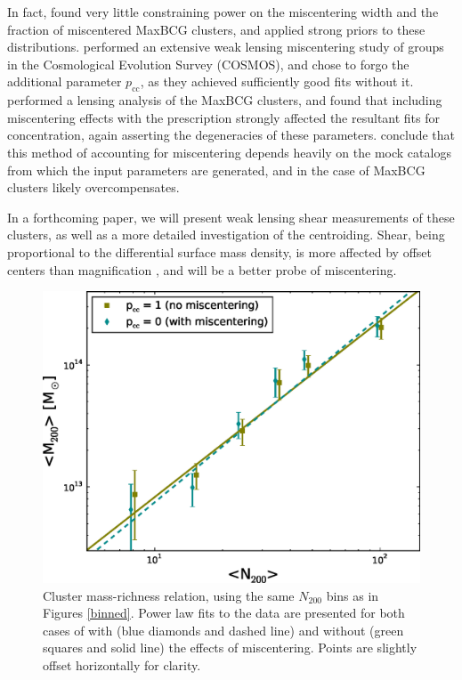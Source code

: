 In fact, \citet{Johnston07} found very little constraining power on the miscentering width and the fraction of miscentered MaxBCG clusters, and applied strong priors to these distributions. \citet{George12} performed an extensive weak lensing miscentering study of groups in the Cosmological Evolution Survey (COSMOS), and chose to forgo the additional parameter $p_{\mathrm{cc}}$, as they achieved sufficiently good fits without it. \citet{Mandelbaum08b} performed a lensing analysis of the MaxBCG clusters, and found that including miscentering effects with the \citet{Johnston07} prescription strongly affected the resultant fits for concentration, again asserting the degeneracies of these parameters. \citet{Mandelbaum08b} conclude that this method of accounting for miscentering depends heavily on the mock catalogs from which the input parameters are generated, and in the case of MaxBCG clusters likely overcompensates. 

In a forthcoming paper, we will present weak lensing shear measurements of these clusters, as well as a more detailed investigation of the centroiding. Shear, being proportional to the differential surface mass density, is more affected by offset centers than magnification \citep{Johnston07}, and will be a better probe of miscentering.




\begin{figure}
\begin{center}
\includegraphics[scale=0.7]{plots_ch3/MassRich_2to1000_U.eps}
\caption[Mass-Richness Relation from Magnification]{Cluster mass-richness relation, using the same $N_{200}$ bins as in Figures \ref{binned}. Power law fits to the data are presented for both cases of with (blue diamonds and dashed line) and without (green squares and solid line) the effects of miscentering. Points are slightly offset horizontally for clarity.}
\label{massrich}
\end{center}
\end{figure}

